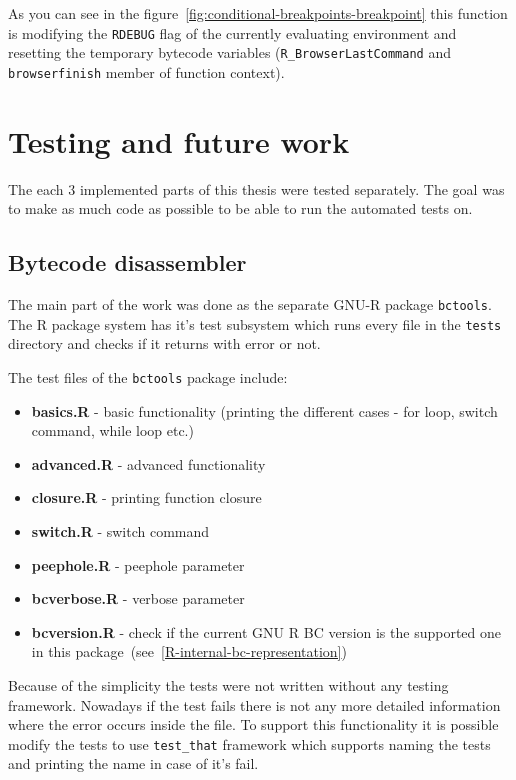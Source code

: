 \documentclass[thesis=M,english]{FITthesis}[2018/10/20]
\newcommand{\code}[1]{\texttt{#1}}
\begin{document}
{As you can see in the figure~\ref{fig:conditional-breakpoints-breakpoint} this function is modifying the \code{RDEBUG} flag of the currently evaluating environment and resetting the temporary bytecode variables (\code{R{\_}BrowserLastCommand} and \code{browserfinish} member of function context).

\chapter{Testing and future work}\label{testing-and-future-work}

The each 3 implemented parts of this thesis were tested separately. The goal was to make as much code as possible to be able to run the automated tests on.

\section{Bytecode disassembler}

The main part of the work was done as the separate GNU-R package \code{bctools}. The R package system has it's test subsystem which runs every file in the \code{tests} directory and checks if it returns with error or not.

The test files of the \code{bctools} package include:
\begin{itemize}
	\item \textbf{basics.R} - basic functionality (printing the different cases - for loop, switch command, while loop etc.)
	\item \textbf{advanced.R} - advanced functionality
	\item \textbf{closure.R} - printing function closure
	\item \textbf{switch.R} - switch command
	\item \textbf{peephole.R} - peephole parameter
	\item \textbf{bcverbose.R} - verbose parameter
	\item \textbf{bcversion.R} - check if the current GNU R BC version is the supported one in this package~(see~\ref{R-internal-bc-representation})
\end{itemize}

Because of the simplicity the tests were not written without any testing framework. Nowadays if the test fails there is not any more detailed information where the error occurs inside the file. To support this functionality it is possible modify the tests to use \code{test{\_}that} framework which supports naming the tests and printing the name in case of it's fail.

}
\end{document}
